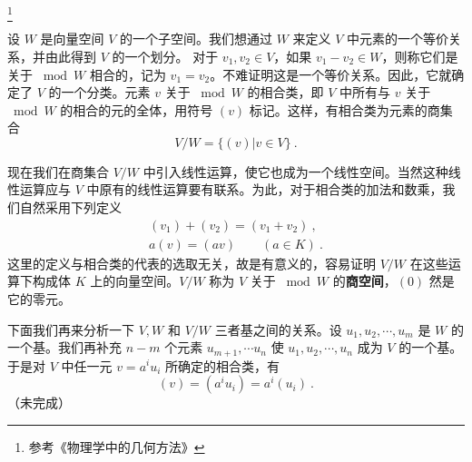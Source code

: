 
\begin{issues}
\issueDraft
\end{issues}




\footnote{参考《物理学中的几何方法》} %

设 $W$ 是向量空间 $V$ 的一个子空间。我们想通过 $W$ 来定义 $V$ 中元素的一个等价关系，并由此得到 $V$ 的一个划分。
对于 $v_1,v_2\in V$，如果 $v_1-v_2\in W$，则称它们是关于 $\bmod W $ 相合的，记为 $v_1=v_2$。不难证明这是一个等价关系。因此，它就确定了 $V $ 的一个分类。元素 $v $ 关于 $\bmod W $ 的相合类，即 $V $ 中所有与 $v $ 关于 $\bmod W $ 的相合的元的全体，用符号 $(v) $ 标记。这样，有相合类为元素的商集合
\begin{equation}
V / W=\{(v) | v \in V\}~.
\end{equation}

现在我们在商集合 $V/W $ 中引入线性运算，使它也成为一个线性空间。当然这种线性运算应与 $V $ 中原有的线性运算要有联系。为此，对于相合类的加法和数乘，我们自然采用下列定义
\begin{equation}
\begin{array}{l}\left(v_{1}\right)+\left(v_{2}\right)=\left(v_{1}+v_{2}\right)~, \\ a(v)=(a v)\qquad (a \in K)~.
\end{array}
\end{equation}
这里的定义与相合类的代表的选取无关，故是有意义的，容易证明 $V/W $ 在这些运算下构成体 $K $ 上的向量空间。$V/W $ 称为 $V $ 关于 $\bmod W$ 的\textbf{商空间}，$(0)$ 然是它的零元。

下面我们再来分析一下 $V,W$ 和 $V/W $ 三者基之间的关系。设 $u_1,u_2,\cdots,u_m$ 是 $W $ 的一个基。我们再补充 $n- m$ 个元素 ${u}_{m+1}, \cdots {u}_{n}$ 使 $u_{1}, u_{2}, \cdots, u_{n}$ 成为 $V$ 的一个基。于是对 $V $ 中任一元 $v=a^iu_i$ 所确定的相合类，有
\begin{equation}
(v)=\left(a^{i} u_{i}\right)=a^{i}\left(u_{i}\right)~.
\end{equation}
（未完成）
